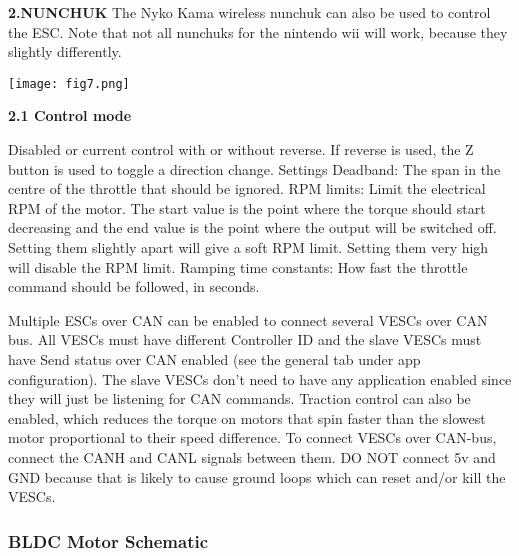 \documentclass[11pt]{article}
\begin{document}
\textbf{2.NUNCHUK}\newline
The Nyko Kama wireless nunchuk can also be used to control the ESC. Note that not all nunchuks for the nintendo wii will work, because they slightly differently.\newline

\begin {center}
\texttt{[image: fig7.png]}\newline

\end{center}

\textbf{2.1 Control mode}\newline

Disabled or current control with or without reverse. If reverse is used, the Z button is used to toggle a direction change.\newline
\newline
\newline
{} Settings\newline
Deadband: The span in the centre of the throttle that should be ignored.\newline
RPM limits: Limit the electrical RPM of the motor. The start value is the point where the torque should start decreasing and the end value is the point where the output will be switched off. Setting them slightly apart will give a soft RPM limit. Setting them very high will disable the RPM limit.\newline
Ramping time constants: How fast the throttle command should be followed, in seconds.\newline

Multiple ESCs over CAN can be enabled to connect several VESCs over CAN bus. All VESCs must have different Controller ID and the slave VESCs must have Send status over CAN enabled (see the general tab under app configuration). The slave VESCs don’t need to have any application enabled since they will just be listening for CAN commands. Traction control can also be enabled, which reduces the torque on motors that spin faster than the slowest motor proportional to their speed difference. To connect VESCs over CAN-bus, connect the CANH and CANL signals between them. DO NOT connect 5v and GND because that is likely to cause ground loops which can reset and/or kill the VESCs.\newline

\subsubsection{BLDC Motor Schematic}
\end{document}
